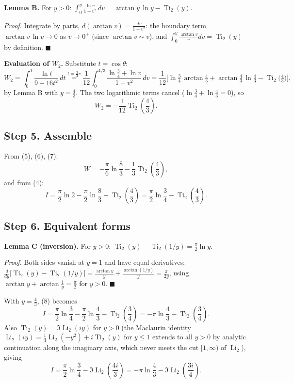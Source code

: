 \documentclass[11pt]{article}
\theoremstyle{remark}
\begin{document}
\textbf{Lemma B.} For $y>0$: $\displaystyle\int_0^{y}\frac{\ln v}{1+v^2}\,dv=\arctan y\,\ln y-\operatorname{Ti}_2(y).$

\textit{Proof.} Integrate by parts, $d(\arctan v)=\frac{dv}{1+v^2}$: the boundary term $\arctan v\,\ln v\to0$ as $v\to0^+$ (since $\arctan v\sim v$), and $\int_0^y\frac{\arctan v}{v}dv=\operatorname{Ti}_2(y)$ by definition. $\blacksquare$

\textbf{Evaluation of $W_2$.} Substitute $t=\cos\theta$:
\[W_2=\int_0^1\frac{\ln t}{9+16t^2}\,dt
\overset{t=\frac34 v}{=}\frac{1}{12}\int_0^{4/3}\frac{\ln\frac34+\ln v}{1+v^2}\,dv
=\frac1{12}\Big[\ln\tfrac34\,\arctan\tfrac43+\arctan\tfrac43\,\ln\tfrac43-\operatorname{Ti}_2\big(\tfrac43\big)\Big],\]
by Lemma B with $y=\frac43$. The two logarithmic terms cancel ($\ln\frac34+\ln\frac43=0$), so
\begin{equation}
W_2=-\frac{1}{12}\operatorname{Ti}_2\!\left(\frac43\right). \tag{7}
\end{equation}

\subsection*{Step 5. Assemble}

From (5), (6), (7):
\[W=-\frac{\pi}{6}\ln\frac83-\frac13\operatorname{Ti}_2\!\left(\frac43\right),\]
and from (4):
\begin{equation}
I=\frac{\pi}{2}\ln2-\frac{\pi}{2}\ln\frac83-\operatorname{Ti}_2\!\left(\frac43\right)
=\frac{\pi}{2}\ln\frac{3}{4}-\operatorname{Ti}_2\!\left(\frac43\right). \tag{8}
\end{equation}

\subsection*{Step 6. Equivalent forms}

\textbf{Lemma C (inversion).} For $y>0$: $\operatorname{Ti}_2(y)-\operatorname{Ti}_2(1/y)=\frac\pi2\ln y$.

\textit{Proof.} Both sides vanish at $y=1$ and have equal derivatives: $\frac{d}{dy}\big[\operatorname{Ti}_2(y)-\operatorname{Ti}_2(1/y)\big]=\frac{\arctan y}{y}+\frac{\arctan(1/y)}{y}=\frac{\pi}{2y}$, using $\arctan y+\arctan\frac1y=\frac\pi2$ for $y>0$. $\blacksquare$

With $y=\frac43$, (8) becomes
\[I=\frac\pi2\ln\frac34-\frac\pi2\ln\frac43-\operatorname{Ti}_2\!\left(\frac34\right)
=-\pi\ln\frac43-\operatorname{Ti}_2\!\left(\frac34\right).\]
Also $\operatorname{Ti}_2(y)=\Im\operatorname{Li}_2(iy)$ for $y>0$ (the Maclaurin identity $\operatorname{Li}_2(iy)=\frac14\operatorname{Li}_2(-y^2)+i\operatorname{Ti}_2(y)$ for $y\le1$ extends to all $y>0$ by analytic continuation along the imaginary axis, which never meets the cut $[1,\infty)$ of $\operatorname{Li}_2$), giving
\[I=\frac{\pi}{2}\ln\frac34-\Im\operatorname{Li}_2\!\left(\frac{4i}{3}\right)=-\pi\ln\frac43-\Im\operatorname{Li}_2\!\left(\frac{3i}{4}\right).\]
\end{document}
